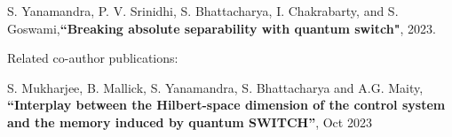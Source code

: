 \begin{enumerate}[label={[P\arabic*]}]  
    \item S. Yanamandra, P. V. Srinidhi, S. Bhattacharya, I. Chakrabarty, and S. Goswami,\textbf{“Breaking absolute separability with quantum switch"}, 2023.
\end{enumerate}
\noindent
Related co-author publications:
\begin{enumerate}[start=2,label={[P\arabic*]}]
    \item S. Mukharjee, B. Mallick, S. Yanamandra, S. Bhattacharya and A.G. Maity, \textbf{“Interplay between the Hilbert-space dimension of the control system and the memory induced by quantum SWITCH”}, Oct 2023
\end{enumerate}